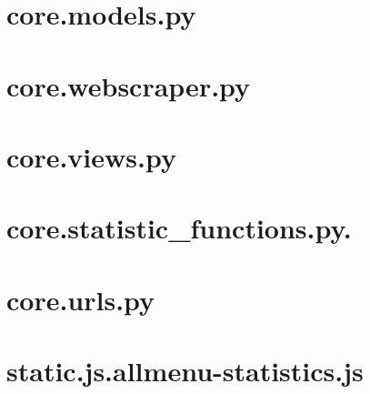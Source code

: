 \section{core.models.py}\label{code:core.models.py}

\section{core.webscraper.py}\label{code:core.webscraper.py}

\section{core.views.py}\label{code:core.views.py}

\section{core.statistic\_functions.py.}\label{code:core.statistic-functions.py}

\section{core.urls.py}\label{code:core.urls.py}

\section{static.js.allmenu-statistics.js}\label{code:static.js.allmenu-statistics.js}

